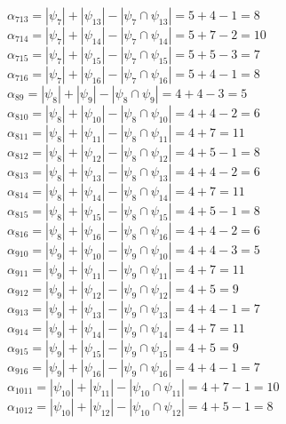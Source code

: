 \documentclass[12pt,a4paper]{report}
\begin{document}
$\alpha_{713} = |\psi_{7}| + |\psi_{13}| - |\psi_{7} \cap \psi_{13}| = 5 + 4 - 1 = 8$ \\
$\alpha_{714} = |\psi_{7}| + |\psi_{14}| - |\psi_{7} \cap \psi_{14}| = 5 + 7 - 2 = 10$ \\
$\alpha_{715} = |\psi_{7}| + |\psi_{15}| - |\psi_{7} \cap \psi_{15}| = 5 + 5 - 3 = 7$ \\
$\alpha_{716} = |\psi_{7}| + |\psi_{16}| - |\psi_{7} \cap \psi_{16}| = 5 + 4 - 1 = 8$ \\
$\alpha_{89} = |\psi_{8}| + |\psi_{9}| - |\psi_{8} \cap \psi_{9}| = 4 + 4 - 3 = 5$ \\
$\alpha_{810} = |\psi_{8}| + |\psi_{10}| - |\psi_{8} \cap \psi_{10}| = 4 + 4 - 2 = 6$ \\
$\alpha_{811} = |\psi_{8}| + |\psi_{11}| - |\psi_{8} \cap \psi_{11}| = 4 + 7 = 11$ \\
$\alpha_{812} = |\psi_{8}| + |\psi_{12}| - |\psi_{8} \cap \psi_{12}| = 4 + 5 - 1 = 8$ \\
$\alpha_{813} = |\psi_{8}| + |\psi_{13}| - |\psi_{8} \cap \psi_{13}| = 4 + 4 - 2 = 6$ \\
$\alpha_{814} = |\psi_{8}| + |\psi_{14}| - |\psi_{8} \cap \psi_{14}| = 4 + 7 = 11$ \\
$\alpha_{815} = |\psi_{8}| + |\psi_{15}| - |\psi_{8} \cap \psi_{15}| = 4 + 5 - 1 = 8$ \\
$\alpha_{816} = |\psi_{8}| + |\psi_{16}| - |\psi_{8} \cap \psi_{16}| = 4 + 4 - 2 = 6$ \\
$\alpha_{910} = |\psi_{9}| + |\psi_{10}| - |\psi_{9} \cap \psi_{10}| = 4 + 4 - 3 = 5$ \\
$\alpha_{911} = |\psi_{9}| + |\psi_{11}| - |\psi_{9} \cap \psi_{11}| = 4 + 7 = 11$ \\
$\alpha_{912} = |\psi_{9}| + |\psi_{12}| - |\psi_{9} \cap \psi_{12}| = 4 + 5 = 9$ \\
$\alpha_{913} = |\psi_{9}| + |\psi_{13}| - |\psi_{9} \cap \psi_{13}| = 4 + 4 - 1 = 7$ \\
$\alpha_{914} = |\psi_{9}| + |\psi_{14}| - |\psi_{9} \cap \psi_{14}| = 4 + 7 = 11$ \\
$\alpha_{915} = |\psi_{9}| + |\psi_{15}| - |\psi_{9} \cap \psi_{15}| = 4 + 5 = 9$ \\
$\alpha_{916} = |\psi_{9}| + |\psi_{16}| - |\psi_{9} \cap \psi_{16}| = 4 + 4 - 1 = 7$ \\
$\alpha_{1011} = |\psi_{10}| + |\psi_{11}| - |\psi_{10} \cap \psi_{11}| = 4 + 7 - 1 = 10$ \\
$\alpha_{1012} = |\psi_{10}| + |\psi_{12}| - |\psi_{10} \cap \psi_{12}| = 4 + 5 - 1 = 8$ \\
\end{document}
